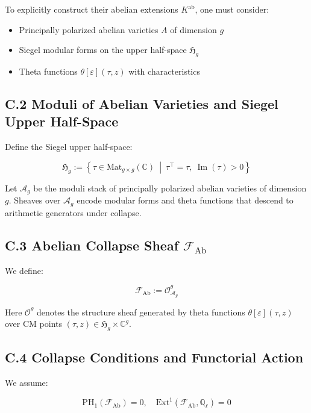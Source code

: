 \documentclass[11pt]{article}
\begin{document}
To explicitly construct their abelian extensions \( K^{\mathrm{ab}} \), one must consider:

\begin{itemize}
  \item Principally polarized abelian varieties \( A \) of dimension \( g \)
  \item Siegel modular forms on the upper half-space \( \mathfrak{H}_g \)
  \item Theta functions \( \theta[\varepsilon](\tau, z) \) with characteristics
\end{itemize}

\subsection*{C.2 Moduli of Abelian Varieties and Siegel Upper Half-Space}

Define the Siegel upper half-space:

\[
\mathfrak{H}_g := \left\{ \tau \in \mathrm{Mat}_{g \times g}(\mathbb{C}) \ \middle|\ \tau^\top = \tau,\ \operatorname{Im}(\tau) > 0 \right\}
\]

Let \( \mathcal{A}_g \) be the moduli stack of principally polarized abelian varieties of dimension \( g \).  
Sheaves over \( \mathcal{A}_g \) encode modular forms and theta functions that descend to arithmetic generators under collapse.

\subsection*{C.3 Abelian Collapse Sheaf \( \mathcal{F}_{\mathrm{Ab}} \)}

We define:

\[
\mathcal{F}_{\mathrm{Ab}} := \mathcal{O}^{\theta}_{\mathcal{A}_g}
\]

Here \( \mathcal{O}^{\theta} \) denotes the structure sheaf generated by theta functions \( \theta[\varepsilon](\tau, z) \) over CM points \( (\tau, z) \in \mathfrak{H}_g \times \mathbb{C}^g \).

\subsection*{C.4 Collapse Conditions and Functorial Action}

We assume:

\[
\mathrm{PH}_1(\mathcal{F}_{\mathrm{Ab}}) = 0, \quad \mathrm{Ext}^1(\mathcal{F}_{\mathrm{Ab}}, \mathbb{Q}_\ell) = 0
\]
\end{document}
